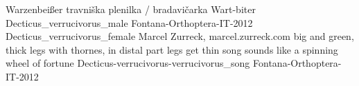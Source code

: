 {Warzenbei{\ss}er} %
{travni\v{s}ka plenilka / bradavi\v{c}arka} %
{Wart-biter} %
{Decticus_verrucivorus_male}  %
{Fontana-Orthoptera-IT-2012} %
{Decticus_verrucivorus_female} %
{Marcel Zurreck, marcel.zurreck.com} %
{big and green, thick legs with thornes, in distal part legs get thin} %
{song sounds like a spinning wheel of fortune} %
{Decticus-verrucivorus-verrucivorus_song} %
{Fontana-Orthoptera-IT-2012} %
